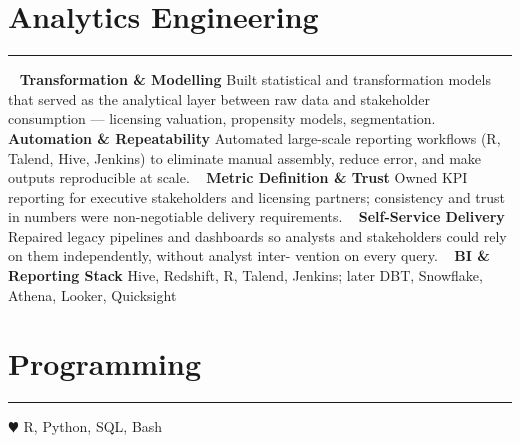 %
%

\vspace{-1.0cm}
\section{\LARGE Analytics Engineering}
\noindent\rule{\textwidth}{0.4pt}
\vspace{-0.2cm}
~
\textbf{\large Transformation \& Modelling}
\faGem Built statistical and transformation models that served as the analytical layer between raw data and stakeholder consumption — licensing valuation, propensity models, segmentation.
~
\textbf{\large Automation \& Repeatability}
\faGem Automated large-scale reporting workflows (R, Talend, Hive, Jenkins) to eliminate manual assembly, reduce error, and make outputs reproducible at scale.
~
\textbf{\large Metric Definition \& Trust}
\faGem Owned KPI reporting for executive stakeholders and licensing partners; consistency and trust in numbers were non-negotiable delivery requirements.
~
\textbf{\large Self-Service Delivery}
\faGem Repaired legacy pipelines and dashboards so analysts and stakeholders could rely on them independently, without analyst inter- vention on every query.
~
\textbf{\large BI \& Reporting Stack}
Hive, Redshift, R, Talend, Jenkins; later DBT, Snowflake, Athena, Looker, Quicksight
\section{\LARGE Programming}
\noindent\rule{\textwidth}{0.4pt}
{\color{red} $\varheartsuit$} R, Python, SQL, Bash

